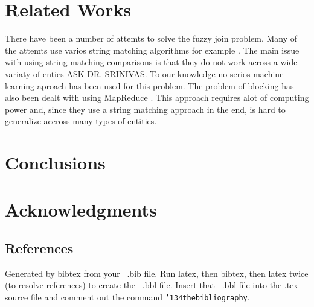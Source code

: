 \documentclass{vldb}
\begin{document}
\section{Related Works}
There have been a number of attemts to solve the fuzzy join problem. Many of the attemts use varios string matching algorithms for example \cite{Wang:String}. The main issue with using string matching comparisons is that they do not work across a wide variaty of enties ASK DR. SRINIVAS. To our knowledge no serios machine learning aproach has been used for this problem. The problem of blocking has also been dealt with using MapReduce \cite{Vernica:MapReduce}. This approach requires alot of computing power and, since they use a string matching approach in the end, is hard to generalize accross many types of entities. 


\section{Conclusions}

\balance

\section{Acknowledgments}




\subsection{References}
Generated by bibtex from your ~.bib file.  Run latex,
then bibtex, then latex twice (to resolve references)
to create the ~.bbl file.  Insert that ~.bbl file into
the .tex source file and comment out
the command \texttt{{\char'134}thebibliography}.




\begin{appendix}

\end{appendix}
\end{document}

